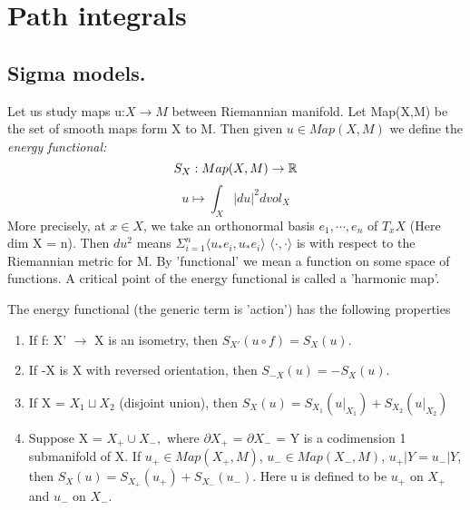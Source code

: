 \section{Path integrals}
\subsection{Sigma models.}
Let us study maps u:$X \rightarrow M$ between Riemannian manifold. Let Map(X,M) be the set of smooth maps form X to M. Then given
$u \in Map(X,M)$ we define the \textit{energy functional:}
\begin{equation*}
 S_X: Map(X,M) \rightarrow \mathbb{R}
\end{equation*}
\begin{equation*}
 u \mapsto \int_X |du|^{2} dvol_X
\end{equation*}
More precisely, at $x \in X$, we take an orthonormal basis $e_1,\cdots, e_n$ of $T_x X$ (Here dim X = n). Then $du^2$
means $\Sigma^{n}_{i=1} \langle u_{*} e_i, u_{*} e_{i} \rangle$ $\langle \cdot , \cdot \rangle$ is 
with respect to the Riemannian metric for M.
By 'functional' we mean a function on some space of functions. A critical point of the energy functional is called a 
'harmonic map'. 
\begin{remark}
 The energy functional (the generic term is 'action') has the following properties
 \begin{enumerate}
  \item If f: X' $\rightarrow$ X is an isometry, then $S_{X'}( u \circ f) = S_X(u).$
  \item If -X is X with reversed orientation, then $S_{-X}(u) = - S_{X}(u).$
  \item If X = $X_1 \sqcup X_2$ (disjoint union), then $S_X (u) = S_{X_{1}}(u|_{X_{1}}) + S_{X_{2}}(u|_{X_{2}})$
 \item Suppose X = $X_{+} \cup X_{-},$ where $\partial X_{+}$ = $\partial X_{-}$ = Y is a codimension 1 submanifold of X.
 If $u_+ \in Map(X_+,M)$, $u_- \in Map(X_-,M)$, $u_{+}|Y = u_{-}|Y$, then $S_{X}(u) = S_{X_{+}}(u_{+}) + S_{X_{-}}(u_{-}).$
 Here u is defined to be $u_+$ on $X_+$ and $u_-$ on $X_-$.
 \end{enumerate}

\end{remark}
